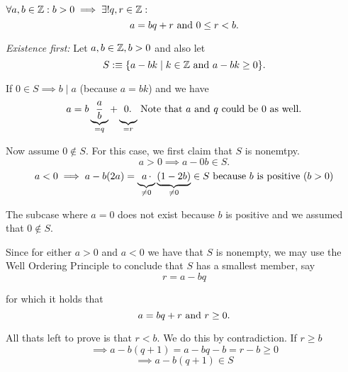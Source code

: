 \begin{thm}
  \label{thm: Divison Algorithm}
  $\forall a,b \in \mathbb{Z}: b > 0 \implies \exists ! q,r \in \mathbb{Z}: $
  \begin{equation}
    a = bq + r $ and $ 0 \leq r < b.
  \end{equation}
\end{thm}
\begin{prf}
  \emph{Existence first:} Let $a,b \in \mathbb{Z}, b > 0$ and also let
  \begin{equation}
    S :\equiv \{ a- bk \mid k \in \integer $ and $ a-bk \geq 0 \}.
  \end{equation}

  If $0 \in S \implies b \mid a $ (because $a=bk$) and we have
  \begin{equation}
    a = b \underbrace{\frac{a}{b}}_{= q} + \underbrace{0.\phantom{\frac{a}{b}\!\!\!\!}}_{= r}
    $ Note that $a$ and $q$ could be $0$ as well$.
  \end{equation}

  Now assume $0 \notin S$. For this case, we first claim that $S$ is nonemtpy.
  \begin{equation}
    a>0 \implies a-0b \in S.
  \end{equation}
  \begin{equation}
    a<0 \implies a-b(2a) = \underbrace{\!\!\phantom{(}a\,\cdot}_{\neq 0} \underbrace{(1-2b)}_{\neq 0} \in S $ because $b$ is positive $ (b>0)
  \end{equation}

  The subcase where $a=0$ does not exist because $b$ is positive and we assumed that $0 \notin S$.

  Since for either $a>0$ and $a<0$ we have that $S$ is nonempty, we may use the Well Ordering Principle to conclude that $S$ has a smallest member, say
  \begin{equation}
    r = a -bq
  \end{equation}

  for which it holds that
  \begin{equation}
    a=bq+r $ and $ r \geq 0.
  \end{equation}

  All thats left to prove is that $r  < b$. We do this by contradiction. If $r \geq b$
  \begin{equation}
    \implies a-b(q+1) = a-bq -b = r-b \geq 0
  \end{equation}
  \begin{equation}
    \implies a-b(q+1) \in S
  \end{equation}


\end{prf}
